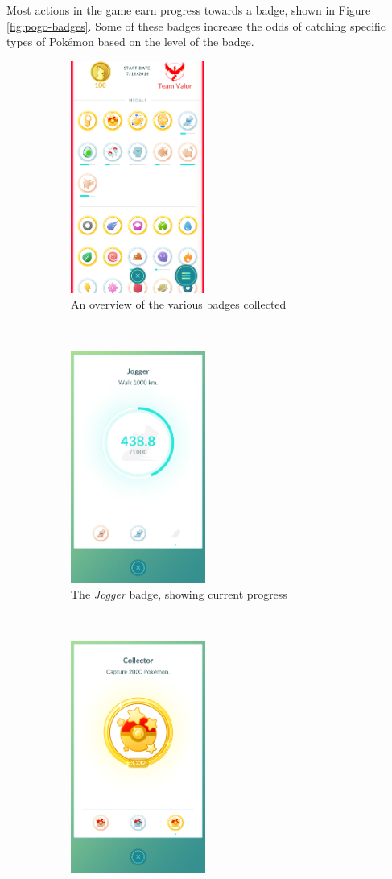 Most actions in the game earn progress towards a badge, shown in Figure \ref{fig:pogo-badges}. Some of these badges increase the odds of catching specific types of Pokémon based on the level of the badge.

\begin{figure}[h]
	\centering
	\begin{subfigure}[t]{0.3\textwidth}
		\centering
		\includegraphics[height=3in]{Figures/pogo-badges}
		\caption{An overview of the various badges collected}
	\end{subfigure}
	~
	\begin{subfigure}[t]{0.3\textwidth}
		\centering
		\includegraphics[height=3in]{Figures/pogo-jogger-badge}
		\caption{The \emph{Jogger} badge, showing current progress}
	\end{subfigure}
	~
	\begin{subfigure}[t]{0.3\textwidth}
		\centering
		\includegraphics[height=3in]{Figures/pogo-collector-badge}

\end{subfigure}
\end{figure}
